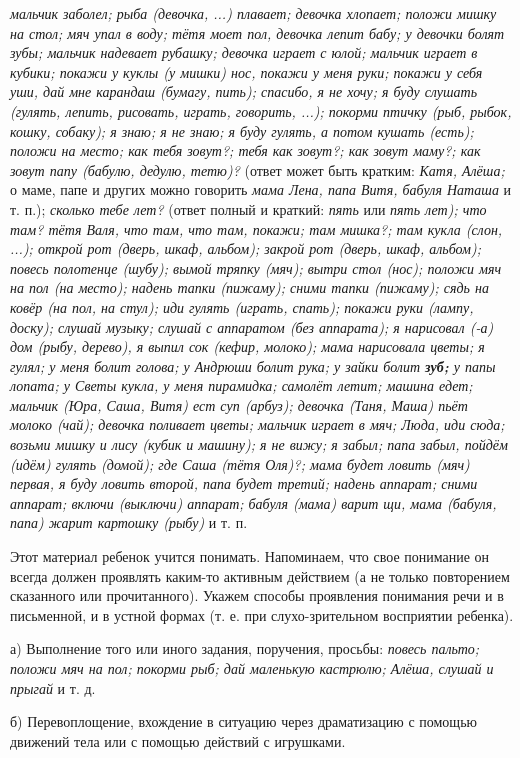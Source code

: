 \documentclass{book}
\renewcommand{\emph}[1]{\textit{#1}}
\begin{document}
\emph{мальчик заболел; рыба (девочка, ...) плавает; девочка хлопает;
положи мишку на стол; мяч упал в воду; тётя моет пол, девочка лепит
бабу; у девочки болят зубы; мальчик надевает рубашку; девочка играет с
юлой; мальчик играет в кубики; покажи у куклы (у мишки) нос, покажи у
меня руки; покажи у себя уши, дай мне карандаш (бумагу, пить); спасибо,
я не хочу; я буду слушать (гулять, лепить, рисовать, играть, говорить,
...); покорми птичку (рыб, рыбок, кошку, собаку); я знаю; я не знаю; я
буду гулять, а потом кушать (есть); положи на место; как тебя зовут?;
тебя как зовут?; как зовут маму?; как зовут папу (бабулю, дедулю,
тетю)?} (ответ может быть кратким: \emph{Катя, Алёша;} о маме, папе и
других можно говорить \emph{мама Лена, папа Витя, бабуля Наташа} и т.
п.); \emph{сколько тебе лет?} (ответ полный и краткий: \emph{пять} или
\emph{пять лет); что там? тётя Валя, что там, что там, покажи; там
мишка?; там кукла (слон, ...); открой рот (дверь, шкаф, альбом); закрой
рот (дверь, шкаф, альбом); повесь полотенце (шубу); вымой тряпку (мяч);
вытри стол (нос); положи мяч на пол (на место); надень тапки (пижаму);
сними тапки (пижаму); сядь на ковёр (на пол, на стул); иди гулять
(играть, спать); покажи руки (лампу, доску); слушай музыку; слушай с
аппаратом (без аппарата); я нарисовал (-а) дом (рыбу, дерево), я выпил
сок (кефир, молоко); мама нарисовала цветы; я гулял; у меня болит
голова; у Андрюши болит рука; у зайки болит \textbf{зуб;} у папы лопата;
у Светы кукла, у меня пирамидка; самолёт летит; машина едет; мальчик
(Юра, Саша, Витя) ест суп (арбуз); девочка (Таня, Маша) пьёт молоко
(чай); девочка поливает цветы; мальчик играет в мяч; Люда, иди сюда;
возьми мишку и лису (кубик и машину); я не вижу; я забыл; папа забыл,
пойдём (идём) гулять (домой); где Саша (тётя Оля)?; мама будет ловить
(мяч) первая, я буду ловить второй, папа будет третий; надень аппарат;
сними аппарат; включи (выключи) аппарат; бабуля (мама) варит щи, мама
(бабуля, папа) жарит картошку (рыбу)} и т. п.

Этот материал ребенок учится понимать. Напоминаем, что свое понимание он
всегда должен проявлять каким-то активным действием (а не только
повторением сказанного или прочитанного). Укажем способы проявления
понимания речи и в письменной, и в устной формах (т. е. при
слухо-зрительном восприятии ребенка).

а) Выполнение того или иного задания, поручения, просьбы: \emph{повесь
пальто; положи мяч на пол; покорми рыб; дай маленькую кастрюлю; Алёша,
слушай и прыгай} и т. д.

б) Перевоплощение, вхождение в ситуацию через драматизацию с помощью
движений тела или с помощью действий с игрушками.
\end{document}
